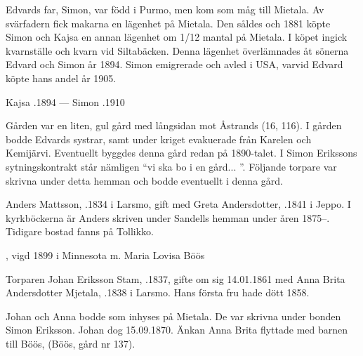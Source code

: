 Edvards far, Simon, var född i Purmo, men kom som måg till Mietala. Av svärfadern fick makarna en lägenhet på Mietala. Den såldes och 1881 köpte Simon och Kajsa en annan lägenhet om 1/12 mantal på Mietala. I köpet ingick kvarnställe och kvarn vid Siltabäcken. Denna lägenhet överlämnades åt sönerna Edvard och Simon år 1894. Simon emigrerade och avled i USA, varvid Edvard köpte hans andel år 1905.

Kajsa .1894  ---	Simon .1910



Gården var en liten, gul gård med långsidan mot Åstrands (16, 116).	I gården bodde Edvards systrar, samt under kriget evakuerade från Karelen och Kemijärvi. Eventuellt byggdes denna gård redan på 1890-talet. I Simon Erikssons sytningskontrakt står nämligen ``vi ska bo i en gård... ''. Följande torpare var skrivna under detta hemman och bodde eventuellt i denna gård.


Anders Mattsson, .1834 i Larsmo, gift med Greta Andersdotter, .1841 i Jeppo. I kyrkböckerna är Anders skriven under Sandells hemman under åren 1875--. Tidigare bostad fanns på Tollikko.
\begin{jhchildren}
  \item {}, vigd 1899 i  Minnesota m. Maria Lovisa Böös
  \item {}
\end{jhchildren}


Torparen Johan Eriksson Stam, .1837, gifte om sig 14.01.1861 med Anna Brita Andersdotter Mjetala,  .1838 i Larsmo. Hans första fru hade dött 1858.
\begin{jhchildren}
  \item {}
  \item {}
  \item {}
  \item {}
\end{jhchildren}

Johan och Anna bodde som inhyses på Mietala. De var skrivna under bonden Simon Eriksson. Johan dog 15.09.1870. Änkan Anna Brita flyttade med barnen till Böös, (Böös, gård nr 137).



